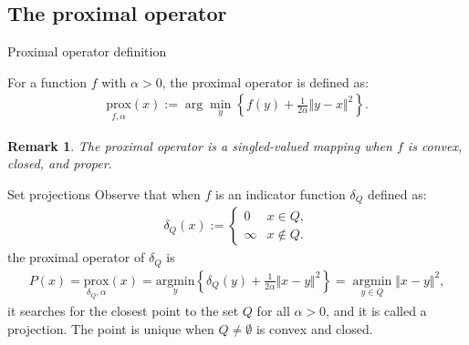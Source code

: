 \documentclass[11pt]{beamer}
\DeclareMathOperator {\argmin}{argmin}
\newtheorem{remark}{Remark}
\begin{document}
    \subsection{The proximal operator}
        \begin{frame}{Proximal operator definition}
            \begin{definition}
                For a function $f$ with $\alpha > 0$, the proximal operator is defined as: 
                \begin{align*}
                    \underset{{f, \alpha}}{\text{prox}}(x) := 
                    \arg\min_{y}\left\lbrace
                        f(y) + \frac{1}{2\alpha} \Vert y - x\Vert^2
                    \right\rbrace. 
                \end{align*}
            \end{definition}  
            \begin{remark}
                The proximal operator is a singled-valued mapping when $f$ is convex, closed, and proper. 
            \end{remark}
        \end{frame}
        \begin{frame}{Set projections}
            Observe that when $f$ is an indicator function $\delta_Q$ defined as: 
            \begin{align*}
                \delta_Q(x) := 
                \begin{cases}
                    0 & x \in Q,
                    \\
                    \infty  & x \not \in Q.
                \end{cases}
            \end{align*}
            the proximal operator of $\delta_Q$ is
            \begin{align*}
               P(x) = \underset{{\delta_Q, \alpha}}{\text{prox}}(x) = \underset{y}{\text{argmin}}
               \left\lbrace
                    \delta_Q(y) + \frac{1}{2\alpha}\Vert x - y\Vert^2
               \right\rbrace = \underset{y\in Q}{\argmin}\Vert x - y\Vert^2,
            \end{align*}
            it searches for the closest point to the set $Q$ for all $\alpha > 0$, and it is called a projection. The point is unique when $Q\neq \emptyset$ is convex and closed.
        \end{frame}
\end{document}
